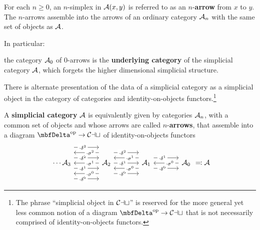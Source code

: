 For each $n \geq 0$, an $n$-simplex in ${\mathord{\mathcal{A}}}(x,y)$ is referred to as an $n$-\textbf{arrow} from $x$ to $y$. The $n$-arrows assemble into the arrows of an ordinary category ${\mathord{\mathcal{A}}}_n$ with the same set of objects as ${\mathord{\mathcal{A}}}$.

In particular:

\begin{defn}\label{defn:underlying-cat}
the category ${\mathord{\mathcal{A}}}_0$ of 0-arrows is the \textbf{underlying category} of the simplicial category ${\mathord{\mathcal{A}}}$, which forgets the higher dimensional simplicial structure.
\end{defn}

There is alternate presentation of the data of a simplicial category as a simplicial object in the category of categories and identity-on-objects functors.\footnote{The phrase ``simplicial object in ${\mathord{\mathcal{Cat}}}$'' is reserved for the more general yet less common notion of a diagram $\Del\op\to\Cat$ that is not necessarily comprised of identity-on-objects functors.}


\begin{dig}\label{dig:simplicial-cat}
  A \textbf{simplicial category} ${\mathord{\mathcal{A}}}$ is equivalently given by categories ${\mathord{\mathcal{A}}}_n$, with a common set of objects and whose arrows are called $n$-\textbf{arrows}, that assemble into a diagram $\Del\op \to \Cat$ of identity-on-objects functors
  \begin{equation}\label{eq:simplicial-cat}
  \begin{tikzcd}[column sep=large]
  \cdots \cA_3 \arrow[r, shift right=2.25em, "\cdot\face^0" description, pos=.35] \arrow[r, shift right=.75em, "\cdot\face^1" description, pos=.35] \arrow[r, shift left=.75em, "\cdot\face^2" description, pos=.35] \arrow[r, shift left=2.25em, "\cdot\face^3" description, pos=.35]& \cA_2  \arrow[l, "\cdot\degen^1" description, pos=.35] \arrow[l, shift left=1.5em, "\cdot\degen^0" description, pos=.35] \arrow[l, shift right=1.5em, "\cdot\degen^2" description, pos=.35] \arrow[r, "\cdot\face^1" description, pos=.35] \arrow[r, shift left=1.5em, "\cdot\face^2" description, pos=.35] \arrow[r, shift right=1.5em, "\cdot\face^0" description, pos=.35]  & \cA_1 \arrow[l, shift left=.75em, "\cdot\degen^0" description, pos=.35] \arrow[l, shift right=.75em, "\cdot\degen^1" description, pos=.35] \arrow[r, shift left=.75em, "\cdot\face^1" description, pos=.35] \arrow[r, shift right=.75em, "\cdot\face^0" description, pos=.35] & \cA_0 \arrow[l, "\cdot\degen^0" description, pos=.35]
  \end{tikzcd}\eqcolon\cA
  \end{equation}
\end{dig}

